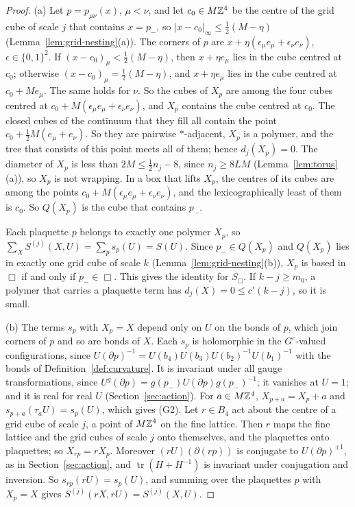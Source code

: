 \begin{proof}
(a) Let $p=p_{\mu\nu}(x)$, $\mu<\nu$, and let $c_0\in M\mathbb Z^4$ be the centre of the grid cube of scale $j$ that contains $x=p_-$, so $|x-c_0|_\infty\le\frac12(M-\eta)$ (Lemma~\ref{lem:grid-nesting}(a)). The corners of $p$ are $x+\eta(\epsilon_\mu e_\mu+\epsilon_\nu e_\nu)$, $\epsilon\in\{0,1\}^2$. If $(x-c_0)_\mu<\frac12(M-\eta)$, then $x+\eta e_\mu$ lies in the cube centred at $c_0$; otherwise $(x-c_0)_\mu=\frac12(M-\eta)$, and $x+\eta e_\mu$ lies in the cube centred at $c_0+Me_\mu$. The same holds for $\nu$. So the cubes of $X_p$ are among the four cubes centred at $c_0+M(\epsilon_\mu e_\mu+\epsilon_\nu e_\nu)$, and $X_p$ contains the cube centred at $c_0$. The closed cubes of the continuum that they fill all contain the point $c_0+\frac12M(e_\mu+e_\nu)$. So they are pairwise $*$-adjacent, $X_p$ is a polymer, and the tree that consists of this point meets all of them; hence $d_j(X_p)=0$. The diameter of $X_p$ is less than $2M\le\frac12n_j-8$, since $n_j\ge8LM$ (Lemma~\ref{lem:torus}(a)), so $X_p$ is not wrapping. In a box that lifts $X_p$, the centres of its cubes are among the points $c_0+M(\epsilon_\mu e_\mu+\epsilon_\nu e_\nu)$, and the lexicographically least of them is $c_0$. So $Q(X_p)$ is the cube that contains $p_-$.

Each plaquette $p$ belongs to exactly one polymer $X_p$, so $\sum_XS^{(j)}(X,U)=\sum_ps_p(U)=S(U)$. Since $p_-\in Q(X_p)$ and $Q(X_p)$ lies in exactly one grid cube of scale $k$ (Lemma~\ref{lem:grid-nesting}(b)), $X_p$ is based in $\Box$ if and only if $p_-\in\Box$. This gives the identity for $S_\Box$. If $k-j\ge m_0$, a polymer that carries a plaquette term has $d_j(X)=0\le c'(k-j)$, so it is small.

(b) The terms $s_p$ with $X_p=X$ depend only on $U$ on the bonds of $p$, which join corners of $p$ and so are bonds of $X$. Each $s_p$ is holomorphic in the $G^c$-valued configurations, since $U(\partial p)^{-1}=U(b_4)U(b_3)U(b_2)^{-1}U(b_1)^{-1}$ with the bonds of Definition~\ref{def:curvature}. It is invariant under all gauge transformations, since $U^g(\partial p)=g(p_-)U(\partial p)g(p_-)^{-1}$; it vanishes at $U=1$; and it is real for real $U$ (Section~\ref{sec:action}). For $a\in M\mathbb Z^4$, $X_{p+a}=X_p+a$ and $s_{p+a}(\tau_aU)=s_p(U)$, which gives (G2). Let $r\in B_4$ act about the centre of a grid cube of scale $j$, a point of $M\mathbb Z^4$ on the fine lattice. Then $r$ maps the fine lattice and the grid cubes of scale $j$ onto themselves, and the plaquettes onto plaquettes; so $X_{rp}=rX_p$. Moreover $(rU)(\partial(rp))$ is conjugate to $U(\partial p)^{\pm1}$, as in Section~\ref{sec:action}, and $\operatorname{tr}(H+H^{-1})$ is invariant under conjugation and inversion. So $s_{rp}(rU)=s_p(U)$, and summing over the plaquettes $p$ with $X_p=X$ gives $S^{(j)}(rX,rU)=S^{(j)}(X,U)$.


\end{proof}
